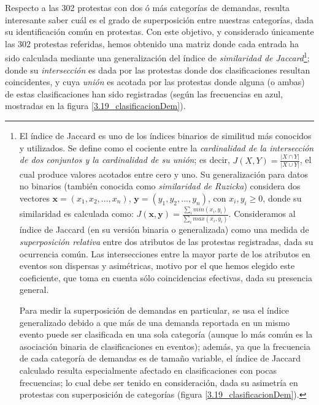 \documentclass[letterpaper, 11pt]{book}
\theoremstyle{definition}
\theoremstyle{remark}
\begin{document}
Respecto a las 302 protestas con dos ó más categorías de demandas, resulta interesante saber cuál es el grado de superposición entre nuestras categorías, dada su identificación común en protestas. 
Con este objetivo, y considerado únicamente las 302 protestas referidas, hemos obtenido una matriz donde cada entrada ha sido calculada mediante una generalización del índice de \emph{similaridad de Jaccard}\footnote{
    El índice de Jaccard es uno de los índices binarios de similitud más conocidos y utilizados. 
    Se define como el cociente entre la \emph{cardinalidad de la intersección de dos conjuntos y la cardinalidad de su unión}; es decir, $J(X,Y) = \frac{|X \cap Y|}{|X \cup Y|}$, el cual produce valores acotados entre cero y uno. 
    Su generalización para datos no binarios (también conocida como \emph{similaridad de Ruzicka}) considera dos vectores $\mathbf{x}=(x_{1},x_{2},...,x_{n})$, $\mathbf{y}=(y_{1},y_{2},...,y_{n})$, con $x_{i},y_{i}\geq 0$, donde su similaridad es calculada como: $J(\mathbf{x},\mathbf{y})=\frac{\sum_{i} min(x_{i},y_{i})}{\sum_{i} max(x_{i},y_{i})}$. 
    Consideramos al índice de Jaccard (en su versión binaria o generalizada) como una medida de \emph{superposición relativa} entre dos atributos de las protestas registradas, dada su ocurrencia común. 
    Las intersecciones entre la mayor parte de los atributos en eventos son dispersas y asimétricas, motivo por el que hemos elegido este coeficiente, que toma en cuenta sólo coincidencias efectivas, dada su presencia general. 
    
    Para medir la superposición de demandas en particular, se usa el índice generalizado debido a que más de una demanda reportada en un mismo evento puede ser clasificada en una sola categoría (aunque lo más común es la asociación binaria de clasificaciones en eventos); además, ya que la frecuencia de cada categoría de demandas es de tamaño variable, el índice de Jaccard calculado resulta especialmente afectado en clasificaciones con pocas frecuencias; lo cual debe ser tenido en consideración, dada su asimetría en protestas con superposición de categorías (figura \ref{3.19_clasificacionDem}).
}; 
donde su \emph{intersección} es dada por las protestas donde dos clasificaciones resultan coincidentes, y cuya \emph{unión} es acotada por las protestas donde alguna (o ambas) de estas clasificaciones han sido registradas (según las frecuencias en azul, mostradas en la figura \ref{3.19_clasificacionDem}).
\end{document}
